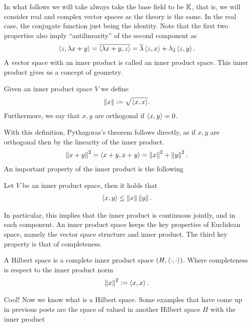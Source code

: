 \documentclass[
    a4paper,
    DIV=14,
    abstract=true,
    numbers=noenddot
]{scrartcl}
\begin{document}
	In what follows we will take always take the base field to be $\mathbb{K}$, that is, we will consider real and complex vector spaces as the theory is the same. In the real case, the conjugate
	function just being the identity. Note that the first two properties also imply  ``antilinearity'' of the second component as
	\begin{align*}
		\left\langle z,\lambda x+  y\right\rangle=\overline{\left\langle\lambda  x+ y,z\right\rangle}= \overline{\lambda }\left\langle z,x\right\rangle+ \lambda _2\left\langle z,y\right\rangle.
	\end{align*}
	A vector space with an inner product is called an inner product space. This inner product gives us a concept of geometry.
	\begin{definition}
		Given an inner product space $V$ we define
		\begin{align*}
			\left\lVert x \right\rVert:= \sqrt{\left\langle x,x\right\rangle}.
		\end{align*}
		Furthermore, we say that $x,y$ are orthogonal if $\left\langle x,y\right\rangle=0$.
	\end{definition}
	With this definition, Pythagoras's theorem follows directly, as if $x,y$ are orthogonal then by the linearity of the inner product.
	\begin{align*}
		\left\lVert x+y \right\rVert^2 = \left\langle x+y,x+y\right\rangle= \left\lVert x \right\rVert^2 +\left\lVert y \right\rVert^2.
	\end{align*}
	An important property of the inner product is the following\begin{proposition}\label{CS}
		Let $V$ be an inner product space, then it holds that
		\begin{align*}
			\left\langle x,y\right\rangle\leq \left\lVert x \right\rVert\left\lVert y \right\rVert.
		\end{align*}
	\end{proposition}
	In particular, this implies that the inner product is continuous jointly, and in each component. An inner product space keeps the key properties of Euclidean space, namely the vector space structure and inner product. The third key property is that of completeness.\begin{definition}
		A Hilbert space is a complete inner product space $(H, \left\langle\cdot ,\cdot \right\rangle)$. Where completeness is respect to the inner product norm
		\begin{align*}
			\left\lVert x \right\rVert^2:= \left\langle x,x\right\rangle.
		\end{align*}
	\end{definition}
	Cool! Now we know what is a Hilbert space. Some examples that have come up in previous posts are the space of  valued in  another Hilbert space $H$ with the inner product
\end{document}
